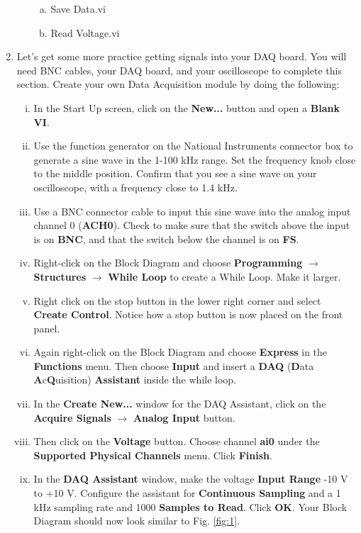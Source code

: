 \documentclass[12pt]{article}
\begin{document}
\begin{enumerate}[1.]
\begin{enumerate}[i.]
\begin{enumerate}[a.]
			\item Save Data.vi
			\item Read Voltage.vi
		\end{enumerate}
	\end{enumerate}
	\item Let's get some more practice getting signals into your DAQ board. You will need BNC cables, your DAQ board, and your oscilloscope to complete this section. Create your own Data Acquisition module by doing the following:
	\begin{enumerate}[i.]
		\item In the Start Up screen, click on the \textbf{New...} button and open a \textbf{Blank VI}.
		\item Use the function generator on the National Instruments connector box to generate a sine wave in the 1-100 kHz range. Set the frequency knob close to the middle position. Confirm that you see a sine wave on your oscilloscope, with a frequency close to 1.4 kHz.
		\item Use a BNC connector cable to input this sine wave into the analog input channel 0 (\textbf{ACH0}). Check to make sure that the switch above the input is on \textbf{BNC}, and that the switch below the channel is on \textbf{FS}.
		\item Right-click on the Block Diagram and choose \textbf{Programming} $\rightarrow$ \textbf{Structures} $\rightarrow$ \textbf{While Loop} to create a While Loop. Make it larger.
		\item Right click on the stop button in the lower right corner and select {\bf Create Control}. Notice how a stop button is now placed on the front panel.
		\item Again right-click on the Block Diagram and choose \textbf{Express} in the \textbf{Functions} menu. Then choose \textbf{Input} and insert a \textbf{DAQ} (\textbf{D}ata \textbf{A}c\textbf{Q}uisition) \textbf{Assistant} inside the while loop.
		\item In the \textbf{Create New...} window for the DAQ Assistant, click on the {\bf Acquire Signals} $\rightarrow$ \textbf{Analog Input} button.
		\item Then click on the \textbf{Voltage} button. Choose channel \textbf{ai0} under the \textbf{Supported Physical Channels} menu. Click \textbf{Finish}.
		\item In the \textbf{DAQ Assistant} window, make the voltage \textbf{Input Range} -10 V to +10 V. 
		Configure the assistant for \textbf{Continuous Sampling} and a 1 kHz sampling rate and 1000 {\bf Samples to Read}. Click \textbf{OK}. Your Block Diagram should now look similar to Fig. \ref{fig:1}.
	\end{enumerate}
	

\end{enumerate}
\end{document}

